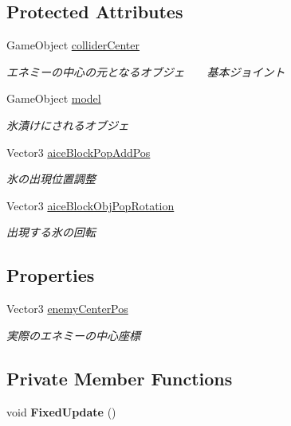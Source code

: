 \subsection*{Protected Attributes}
\begin{DoxyCompactItemize}
\item 
Game\+Object \hyperlink{class_enemy_a17d5f27a6ec77c562b8cc8abbfcaab62}{collider\+Center}
\begin{DoxyCompactList}\small\item\em エネミーの中心の元となるオブジェ　　基本ジョイント \end{DoxyCompactList}\item 
Game\+Object \hyperlink{class_enemy_abb7ad3ec25f442ac6170b48e3b868527}{model}
\begin{DoxyCompactList}\small\item\em 氷漬けにされるオブジェ \end{DoxyCompactList}\item 
Vector3 \hyperlink{class_enemy_a0906c6b765e32f42402a6e5aefbe095a}{aice\+Block\+Pop\+Add\+Pos}
\begin{DoxyCompactList}\small\item\em 氷の出現位置調整 \end{DoxyCompactList}\item 
Vector3 \hyperlink{class_enemy_af5beb8b2bb119fd3ca44798fd8a8db11}{aice\+Block\+Obj\+Pop\+Rotation}
\begin{DoxyCompactList}\small\item\em 出現する氷の回転 \end{DoxyCompactList}\end{DoxyCompactItemize}
\subsection*{Properties}
\begin{DoxyCompactItemize}
\item 
Vector3 \hyperlink{class_enemy_ac8ac5520ab8c301a37b2482c6626fba7}{enemy\+Center\+Pos}
\begin{DoxyCompactList}\small\item\em 実際のエネミーの中心座標 \end{DoxyCompactList}\end{DoxyCompactItemize}
\subsection*{Private Member Functions}
\begin{DoxyCompactItemize}
\item 
\mbox{\label{class_enemy_af061b512970e551024405942104355e2}} 
void {\bfseries Fixed\+Update} ()
\end{DoxyCompactItemize}
